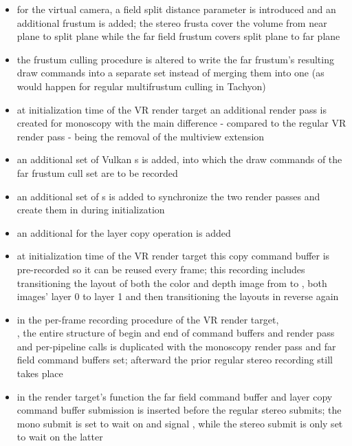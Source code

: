 \begin{itemize}
\item for the virtual camera, a field split distance parameter is introduced and an additional frustum is added; the stereo frusta cover the volume from near plane to split plane while the far field frustum covers split plane to far plane
\item the frustum culling procedure is altered to write the far frustum's resulting draw commands into a separate set instead of merging them into one (as would happen for regular multifrustum culling in \gls{Tachyon})
\item at initialization time of the \gls{VR} render target an additional render pass is created for monoscopy with the main difference - compared to the regular \gls{VR} render pass - being the removal of the multiview extension
\item an additional set of Vulkan s is added, into which the draw commands of the far frustum cull set are to be recorded
\item an additional set of s is added to synchronize the two render passes and create them in  during initialization
\item an additional  for the layer copy operation is added
\item at initialization time of the \gls{VR} render target this copy command buffer is pre-recorded so it can be reused every frame; this recording includes transitioning the layout of both the color and depth image from  to ,  both images' layer 0 to layer 1 and then transitioning the layouts in reverse again
\item in the per-frame recording procedure of the \gls{VR} render target, \\, the entire structure of begin and end of command buffers and render pass and per-pipeline  calls is duplicated with the monoscopy render pass and far field command buffers set; afterward the prior regular stereo recording still takes place
\item in the render target's  function the far field command buffer and layer copy command buffer submission is inserted before the regular stereo submits; the mono submit is set to wait on  and signal , while the stereo submit is only set to wait on the latter

\end{itemize}
